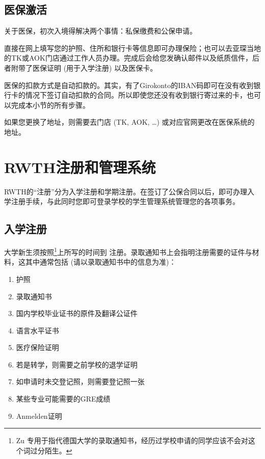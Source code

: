   \subsection{医保激活}\label{subsec:医保激活}

    关于医保，初次入境得解决两个事情：私保缴费和公保申请。

    直接在网上填写您的护照、住所和银行卡等信息即可办理保险；也可以去亚琛当地的TK或AOK门店通过工作人员办理。完成后会给您发确认邮件以及纸质信件，后者附带了医保证明 (用于入学注册) 以及医保卡。

    医保的扣款方式是自动扣款的。其实，有了Girokonto的IBAN码即可在没有收到银行卡的情况下签订自动扣款的合同。所以即使您还没有收到银行寄过来的卡，也可以完成本小节的所有步骤。

    如果您更换了地址，则需要去门店 (TK, AOK, …) 或对应官网更改在医保系统的地址。

\section{RWTH注册和管理系统}\label{sec:RWTH注册和管理系统}

  RWTH的``注册''分为入学注册和学期注册。在签订了公保合同以后，即可办理入学注册手续，与此同时您即可登录学校的学生管理系统管理您的各项事务。

  \subsection{入学注册}\label{subsec:入学注册}

    大学新生须按照\footnote{Zu 专用于指代德国大学的录取通知书，经历过学校申请的同学应该不会对这个词过分陌生。}上所写的时间到\href{https://www.rwth-aachen.de/go/id/pvd/lidx/1}{} 注册。录取通知书上会指明注册需要的证件与材料，这其中通常包括 (请以录取通知书中的信息为准)：
    \begin{enumerate}
      \item 护照
      \item 录取通知书
      \item 国内学校毕业证书的原件及翻译公证件
      \item 语言水平证书
      \item 医疗保险证明
      \item 若是转学，则需要之前学校的退学证明
      \item 如申请时未交登记照，则需要登记照一张
      \item 某些专业可能需要的GRE成绩
      \item Anmelden证明
    \end{enumerate}
    
